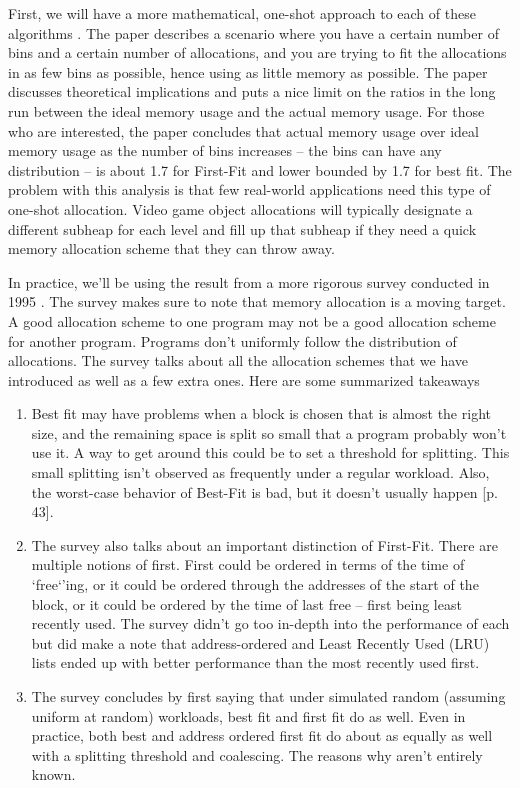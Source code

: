 First, we will have a more mathematical, one-shot approach to each of these algorithms \cite{Garey:1972:WAM:800152.804907}.
The paper describes a scenario where you have a certain number of bins and a certain number of allocations, and you are trying to fit the allocations in as few bins as possible, hence using as little memory as possible.
The paper discusses theoretical implications and puts a nice limit on the ratios in the long run between the ideal memory usage and the actual memory usage.
For those who are interested, the paper concludes that actual memory usage over ideal memory usage as the number of bins increases -- the bins can have any distribution -- is about 1.7 for First-Fit and lower bounded by 1.7 for best fit.
The problem with this analysis is that few real-world applications need this type of one-shot allocation.
Video game object allocations will typically designate a different subheap for each level and fill up that subheap if they need a quick memory allocation scheme that they can throw away.

In practice, we'll be using the result from a more rigorous survey conducted in 1995 \cite{10.1007/3-540-60368-9_19}.
The survey makes sure to note that memory allocation is a moving target.
A good allocation scheme to one program may not be a good allocation scheme for another program.
Programs don't uniformly follow the distribution of allocations.
The survey talks about all the allocation schemes that we have introduced as well as a few extra ones.
Here are some summarized takeaways

\begin{enumerate}
\item Best fit may have problems when a block is chosen that is almost the right size, and the remaining space is split so small that a program probably won't use it.
  A way to get around this could be to set a threshold for splitting.
  This small splitting isn't observed as frequently under a regular workload.
  Also, the worst-case behavior of Best-Fit is bad, but it doesn't usually happen [p. 43].
\item The survey also talks about an important distinction of First-Fit.
  There are multiple notions of first.
  First could be ordered in terms of the time of `free`'ing, or it could be ordered through the addresses of the start of the block, or it could be ordered by the time of last free -- first being least recently used.
  The survey didn't go too in-depth into the performance of each but did make a note that address-ordered and Least Recently Used (LRU) lists ended up with better performance than the most recently used first.
\item The survey concludes by first saying that under simulated random (assuming uniform at random) workloads, best fit and first fit do as well. Even in practice, both best and address ordered first fit do about as equally as well with a splitting threshold and coalescing. The reasons why aren't entirely known.
\end{enumerate}

